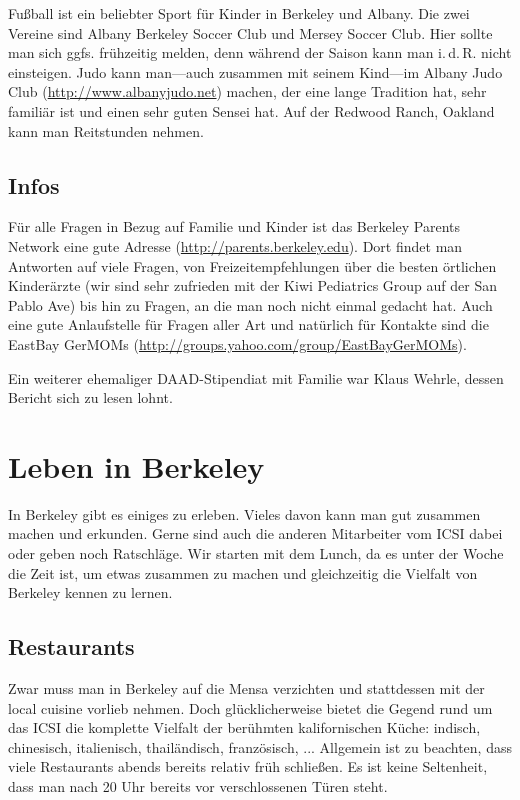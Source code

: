 \documentclass[a4paper]{scrreprt}
\begin{document}
Fußball ist ein beliebter Sport für Kinder in Berkeley und Albany. 
Die zwei Vereine sind Albany Berkeley Soccer Club und Mersey Soccer Club. 
Hier sollte man sich ggfs. frühzeitig melden, denn während der Saison kann man i.\,d.\,R. nicht einsteigen. 
Judo kann man---auch zusammen mit seinem Kind---im Albany Judo Club (\url{http://www.albanyjudo.net}) machen, 
der eine lange Tradition hat, sehr familiär ist und einen sehr guten Sensei hat. 
Auf der Redwood Ranch, Oakland kann man Reitstunden nehmen.

\section{Infos}

Für alle Fragen in Bezug auf Familie und Kinder ist das Berkeley Parents Network eine gute Adresse (\url{http://parents.berkeley.edu}). Dort findet man Antworten auf viele Fragen, von Freizeitempfehlungen über die besten örtlichen Kinderärzte (wir sind sehr zufrieden mit der Kiwi Pediatrics Group auf der San Pablo Ave) bis hin zu Fragen, an die man noch nicht einmal gedacht hat. Auch eine gute Anlaufstelle für Fragen aller Art und natürlich für Kontakte sind die EastBay GerMOMs (\url{http://groups.yahoo.com/group/EastBayGerMOMs}).

Ein weiterer ehemaliger DAAD-Stipendiat mit Familie war Klaus Wehrle, dessen Bericht sich zu lesen lohnt.

\chapter{Leben in Berkeley}

In Berkeley gibt es einiges zu erleben. Vieles davon kann man gut zusammen machen und erkunden. Gerne sind auch die anderen Mitarbeiter vom ICSI dabei oder geben noch Ratschläge. Wir starten mit dem Lunch, da es unter der Woche die Zeit ist, um etwas zusammen zu machen und gleichzeitig die Vielfalt von Berkeley kennen zu lernen.

\section{Restaurants}

Zwar muss man in Berkeley auf die Mensa verzichten und stattdessen mit der local cuisine vorlieb nehmen. Doch glücklicherweise bietet die Gegend rund um das ICSI die komplette Vielfalt der berühmten kalifornischen Küche: indisch, chinesisch, italienisch, thailändisch, französisch, ... Allgemein ist zu beachten, dass viele Restaurants abends bereits relativ früh schließen. Es ist keine Seltenheit, dass man nach 20 Uhr bereits vor verschlossenen Türen steht.
\end{document}
